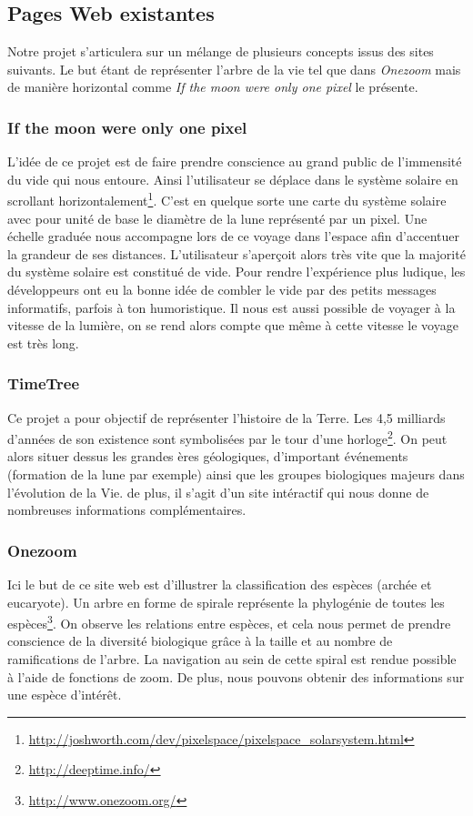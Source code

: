 \documentclass[a4paper]{article}
\begin{document}
	\subsection{Pages Web existantes}
		Notre projet s'articulera sur un mélange de plusieurs concepts issus des sites suivants. Le but étant de représenter l'arbre de la vie tel que dans \emph{Onezoom} mais de manière horizontal comme \emph{If the moon were only one pixel} le présente.

		\subsubsection{If the moon were only one pixel}
			L’idée de ce projet est de faire prendre conscience au grand public de l'immensité du vide qui nous entoure. Ainsi l'utilisateur se déplace dans le système solaire en scrollant horizontalement\footnote{\url{http://joshworth.com/dev/pixelspace/pixelspace_solarsystem.html}}. C'est en quelque sorte une carte du système solaire avec pour unité de base le diamètre de la lune représenté par un pixel. Une échelle graduée nous accompagne lors de ce voyage dans l'espace afin d'accentuer la grandeur de ses distances. L'utilisateur s’aperçoit alors très vite que la majorité du système solaire est constitué de vide. Pour rendre l'expérience plus ludique, les développeurs ont eu la bonne idée de combler le vide par des petits messages informatifs, parfois à ton humoristique. Il nous est aussi possible de voyager à la vitesse de la lumière, on se rend alors compte que même à cette vitesse le voyage est très long.         
 		
		\subsubsection{TimeTree}
			Ce projet a pour objectif de représenter l'histoire de la Terre. Les 4,5 milliards d'années de son existence sont symbolisées par le tour d'une horloge\footnote{\url{http://deeptime.info/}}. On peut alors situer dessus les grandes ères géologiques, d'important événements (formation de la lune par exemple) ainsi que les groupes biologiques majeurs dans l'évolution de la Vie. de plus, il s'agit d'un site intéractif qui nous donne de nombreuses informations complémentaires.
	
		\subsubsection{Onezoom}
			Ici le but de ce site web est d'illustrer la classification des espèces (archée et eucaryote). Un arbre en forme de spirale représente la phylogénie de toutes les espèces\footnote{\url{http://www.onezoom.org/}}. On observe les relations entre espèces, et cela nous permet de prendre conscience de la diversité biologique grâce à la taille et au nombre de ramifications de l'arbre.
			La navigation au sein de cette spiral est rendue possible à l'aide de fonctions de zoom. De plus, nous pouvons obtenir des informations sur une espèce d'intérêt.
			    	
\end{document}
